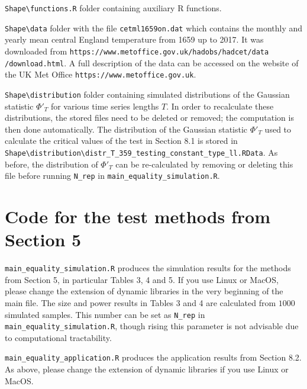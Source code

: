 \documentclass[a4paper,12pt]{article}
\begin{document}
\verb|Shape\functions.R| \hspace{1pt} folder containing auxiliary R functions.

\verb|Shape\data| \hspace{1pt} folder with the file \verb|cetml1659on.dat| which contains the monthly and yearly mean central England temperature from 1659 up to 2017. It was downloaded from \verb|https://www.metoffice.gov.uk/hadobs/hadcet/data| \verb|/download.html|. A full description of the data can be accessed on the website of the UK Met Office \verb|https://www.metoffice.gov.uk|. 

\verb|Shape\distribution| \hspace{1pt} folder containing simulated distributions of the Gaussian statistic $\Phi'_{T}$ for various time series lengths $T$. In order to recalculate these distributions, the stored files need to be deleted or removed; the computation is then done automatically. The distribution of the Gaussian statistic $\Phi'_T$ used to calculate the critical values of the test in Section 8.1 is stored in \verb|Shape\distribution\distr_T_359_testing_constant_type_ll.RData|. \newline As before, the distribution of $\Phi'_T$ can be re-calculated by removing or deleting this file before running \verb|N_rep| in \verb|main_equality_simulation.R|.  
\vspace{0.2cm}



\section*{Code for the test methods from Section 5}


\everypar{\hangafter=1\hangindent=1.45cm\relax}

\verb|main_equality_simulation.R| \hspace{1pt} produces the simulation results for the methods from Section 5, in particular Tables 3, 4 and 5. If you use Linux or Mac\-OS, please change the extension of dynamic libraries in the very beginning of the main file. The size and power results in Tables 3 and 4 are calculated from $1000$ simulated samples. This number can be set as \verb|N_rep| in \verb|main_equality_simulation.R|, though rising this parameter is not advisable due to computational tractability. 

\verb|main_equality_application.R| \hspace{1pt} produces the application results from Section 8.2. As above, please change the extension of dynamic libraries if you use Linux or MacOS.
\end{document}
